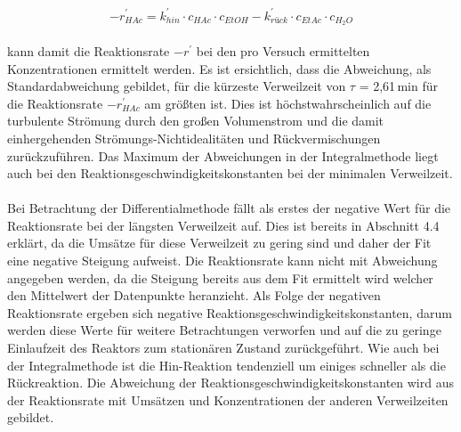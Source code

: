 \documentclass[12pt,liststotoc]{report}
\begin{document}
\begin{equation}
 \label{geschwindigkeitsgesetz}
 -r^{'}_{HAc} = k^{'}_{hin} \cdot c_{HAc} \cdot c_{EtOH} - k^{'}_{rück} \cdot c_{EtAc} \cdot c_{H_2O}
\end{equation}
\\
\noindent
kann damit die Reaktionsrate $-r^{'}$ bei den pro Versuch ermittelten Konzentrationen ermittelt werden. Es ist ersichtlich, dass die Abweichung, als Standardabweichung gebildet, für die kürzeste Verweilzeit von $\tau$ =  2,61\,min für die Reaktionsrate  $-r^{'}_{HAc}$ am größten ist. Dies ist höchstwahrscheinlich auf die turbulente Strömung durch den großen Volumenstrom und die damit einhergehenden Strömungs-Nichtidealitäten und Rückvermischungen zurückzuführen. Das Maximum der Abweichungen in der Integralmethode liegt auch bei den Reaktionsgeschwindigkeitskonstanten bei der minimalen Verweilzeit. 
\\
\\
Bei Betrachtung der Differentialmethode fällt als erstes der negative Wert für die Reaktionsrate bei der längsten Verweilzeit auf. Dies ist bereits in Abschnitt 4.4 erklärt, da die Umsätze für diese Verweilzeit zu gering sind und daher der Fit eine negative Steigung aufweist. Die Reaktionsrate kann nicht mit Abweichung angegeben werden, da die Steigung bereits aus dem Fit ermittelt wird welcher den Mittelwert der Datenpunkte heranzieht. Als Folge der negativen Reaktionsrate ergeben sich negative Reaktionsgeschwindigkeitskonstanten, darum werden diese Werte für weitere Betrachtungen verworfen und auf die zu geringe Einlaufzeit des Reaktors zum stationären Zustand zurückgeführt. Wie auch bei der Integralmethode ist die Hin-Reaktion tendenziell um einiges schneller als die Rückreaktion. Die Abweichung der Reaktionsgeschwindigkeitskonstanten wird aus der Reaktionsrate mit Umsätzen und Konzentrationen der anderen Verweilzeiten gebildet. 
\end{document}
